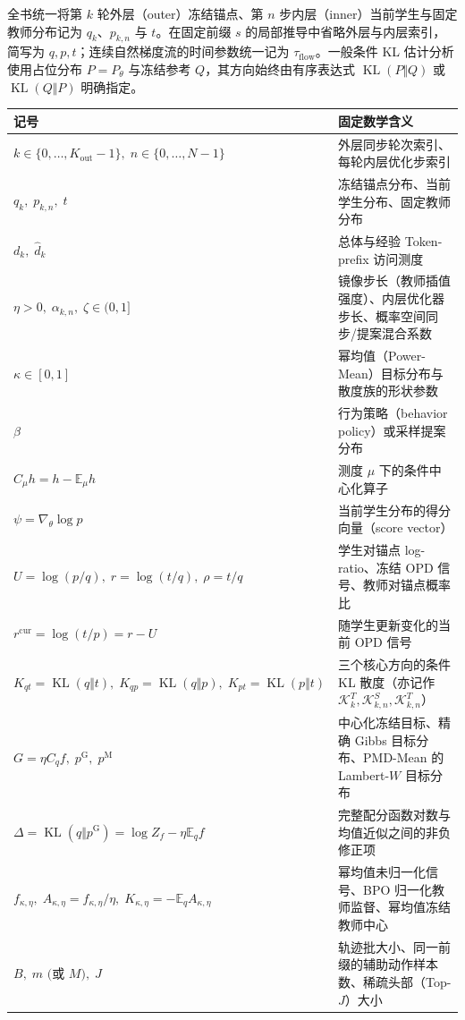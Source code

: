 \documentclass[lang=cn,scheme=chinese,openany]{elegantbook}
\newcommand{\E}{\mathbb E}
\newcommand{\KL}{\operatorname{KL}}
\begin{document}
全书统一将第 $k$ 轮外层（outer）冻结锚点、第 $n$ 步内层（inner）当前学生与固定教师分布记为 $q_k$、$p_{k,n}$ 与 $t$。在固定前缀 $s$ 的局部推导中省略外层与内层索引，简写为 $q,p,t$；连续自然梯度流的时间参数统一记为 $\tau_{\mathrm{flow}}$。一般条件 KL 估计分析使用占位分布 $P=P_\theta$ 与冻结参考 $Q$，其方向始终由有序表达式 $\KL(P\Vert Q)$ 或 $\KL(Q\Vert P)$ 明确指定。

\begin{center}
\begin{tabularx}{\textwidth}{@{}l>{\raggedright\arraybackslash}X@{}}
\toprule
记号 & 固定数学含义\\
\midrule
$k\in\{0,\ldots,K_{\mathrm{out}}-1\},\; n\in\{0,\ldots,N-1\}$ & 外层同步轮次索引、每轮内层优化步索引\\
$q_k,\; p_{k,n},\; t$ & 冻结锚点分布、当前学生分布、固定教师分布\\
$d_k,\; \widehat d_k$ & 总体与经验 Token-prefix 访问测度\\
$\eta>0,\; \alpha_{k,n},\; \zeta\in(0,1]$ & 镜像步长（教师插值强度）、内层优化器步长、概率空间同步/提案混合系数\\
$\kappa\in[0,1]$ & 幂均值（Power-Mean）目标分布与散度族的形状参数\\
$\beta$ & 行为策略（behavior policy）或采样提案分布\\
$C_\mu h=h-\E_\mu h$ & 测度 $\mu$ 下的条件中心化算子\\
$\psi=\nabla_\theta\log p$ & 当前学生分布的得分向量（score vector）\\
$U=\log(p/q),\; r=\log(t/q),\; \rho=t/q$ & 学生对锚点 log-ratio、冻结 OPD 信号、教师对锚点概率比\\
$r^{\mathrm{cur}}=\log(t/p)=r-U$ & 随学生更新变化的当前 OPD 信号\\
$K_{qt}=\KL(q\Vert t),\; K_{qp}=\KL(q\Vert p),\; K_{pt}=\KL(p\Vert t)$ & 三个核心方向的条件 KL 散度（亦记作 $\mathcal K_k^T,\mathcal K_{k,n}^S,\mathcal K_{k,n}^T$）\\
$G=\eta C_q f,\; p^{\mathrm G},\; p^{\mathrm M}$ & 中心化冻结目标、精确 Gibbs 目标分布、PMD-Mean 的 Lambert-$W$ 目标分布\\
$\Delta=\KL(q\Vert p^{\mathrm G})=\log Z_f-\eta\E_q f$ & 完整配分函数对数与均值近似之间的非负修正项\\
$f_{\kappa,\eta},\; A_{\kappa,\eta}=f_{\kappa,\eta}/\eta,\; K_{\kappa,\eta}=-\E_q A_{\kappa,\eta}$ & 幂均值未归一化信号、BPO 归一化教师监督、幂均值冻结教师中心\\
$B,\; m\text{ (或 }M\text{)},\; J$ & 轨迹批大小、同一前缀的辅助动作样本数、稀疏头部（Top-$J$）大小\\
\bottomrule
\end{tabularx}
\end{center}
\end{document}
